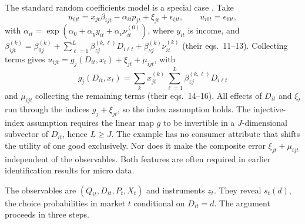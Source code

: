 The standard random coefficients model is a special case \citep[Section~3]{BerryHaile2024}. Take
\begin{equation*}
  u_{ijt} = x_{jt}\beta_{ijt} - \alpha_{it}p_{jt} + \xi_{jt} + \epsilon_{ijt}, \qquad u_{i0t} = \epsilon_{i0t},
\end{equation*}
with $\alpha_{it} = \exp(\alpha_0 + \alpha_y y_{it} + \alpha_\nu \nu^{(0)}_{it})$, where $y_{it}$ is income, and
$\beta^{(k)}_{ijt} = \beta^{(k)}_{0j} + \sum_{\ell=1}^{L}\beta^{(k,\ell)}_{zj}D_{i\ell t} + \beta^{(k)}_{\nu j}\nu^{(k)}_{it}$
(their eqs.~11--13). Collecting terms gives $u_{ijt} = g_j(D_{it}, x_t) + \xi_{jt} + \mu_{ijt}$, with
\begin{equation}\label{eq:08-bh24-example}
  g_j(D_{it}, x_t) =\sum_{k} x^{(k)}_{jt}\sum_{\ell=1}^{L}\beta^{(k,\ell)}_{zj}D_{i\ell t}
\end{equation}
and $\mu_{ijt}$ collecting the remaining terms (their eqs.~14--16). All effects of $D_{it}$ and $\xi_t$ run through the
indices $g_j + \xi_{jt}$, so the index assumption holds. The injective-index assumption requires the linear map $g$ to
be invertible in a $J$-dimensional subvector of $D_{it}$, hence $L \geq J$. The example has no consumer attribute that
shifts the utility of one good exclusively. Nor does it make the composite error $\xi_{jt} + \mu_{ijt}$ independent of
the observables. Both features are often required in earlier identification results for micro data.

The observables are $(Q_{it}, D_{it}, P_t, X_t)$ and instruments $z_t$. They reveal $s_t(d)$, the choice probabilities in
market $t$ conditional on $D_{it} = d$. The argument proceeds in three steps.

